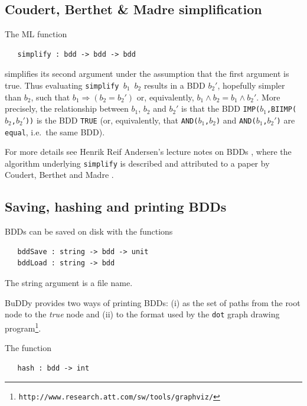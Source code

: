 \documentclass[12pt,fleqn]{article}
\renewcommand{\t}[1]{\mbox{\tt #1}}
\newcommand{\Buddy}{BuDDy{}}
\begin{document}
\subsection{Coudert, Berthet \& Madre simplification}

The ML function

\begin{verbatim}
   simplify : bdd -> bdd -> bdd
\end{verbatim}

simplifies its second argument under the assumption that the first
argument is true. Thus evaluating
\t{simplify~$b_1$~$b_2$} results in a BDD $b_2'$, hopefully simpler than $b_2$, such that
$b_1 \Rightarrow (b_2 = b_2')$ or, equivalently, \mbox{$b_1 \wedge b_2 = b_1 \wedge b_2'$}.
More precisely,
the relationship between $b_1$, $b_2$ and $b_2'$ is that
the BDD \t{IMP($b_1$,BIIMP($b_2$,$b_2'$))} is the BDD \t{TRUE}
(or, equivalently, that \t{AND($b_1$,$b_2$)} and \t{AND($b_1$,$b_2'$)}
are \t{equal}, i.e.~the same BDD).

For more details see Henrik Reif Andersen's lecture
notes on BDDs \cite{HenrikNotes}, where
the algorithm underlying \t{simplify} is described and attributed to a paper by
Coudert, Berthet and Madre \cite{CoudertBerthetMadre}.

\subsection{Saving, hashing and printing BDDs}\label{printing}

BDDs can be saved on disk with the functions

\begin{verbatim}
   bddSave : string -> bdd -> unit
   bddLoad : string -> bdd
\end{verbatim}

The string argument is a file name.

\Buddy{} provides two ways of printing BDDs: (i) as the set of paths from
the root node to the {\it{true}} node and (ii) to the format used by
the \t{dot} graph drawing
program\footnote{\texttt{http://www.research.att.com/sw/tools/graphviz/}}.

The function

\begin{verbatim}
   hash : bdd -> int
\end{verbatim}
\end{document}
